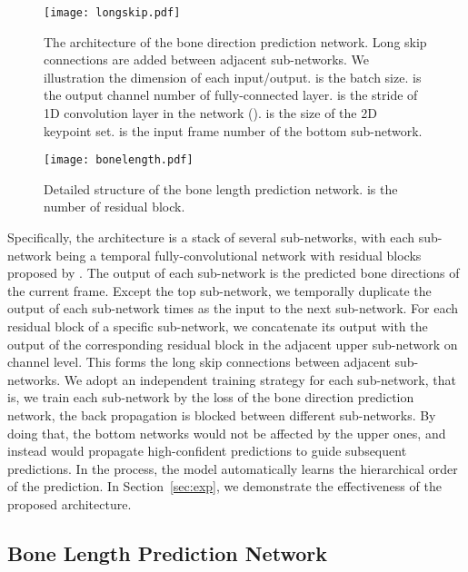 \documentclass[journal]{IEEEtran}
\begin{document}
\begin{figure}[!t]

\vspace{-2mm}
\centering
\texttt{[image: longskip.pdf]}

\caption{The architecture of the bone direction prediction network. Long skip connections are added between adjacent sub-networks. We illustration the dimension of each input/output.  is the batch size.  is the output channel number of fully-connected layer.  is the stride of 1D convolution layer in the network ().  is the size of the 2D keypoint set.  is
the input frame number of the bottom sub-network.}
\vspace{-1mm}
\label{fig:longpass}
\end{figure}
\begin{figure}[!t]

\vspace{+0mm}
\centering
\texttt{[image: bonelength.pdf]}

\caption{Detailed structure of the bone length prediction network.  is the number of residual block.}
\vspace{-1mm}
\label{fig:bl}
\end{figure}

Specifically, the architecture is a stack of several sub-networks, with each sub-network being a temporal fully-convolutional network with residual blocks proposed by \cite{pavllo20193d}. The output of each sub-network is the predicted bone directions of the current frame. Except the top sub-network, we temporally duplicate the output of each sub-network  times as the input to the next sub-network. For each residual block of a specific sub-network, we concatenate its output with the output of the corresponding residual block in the adjacent upper sub-network on channel level. This forms the long skip connections between adjacent sub-networks. We adopt an independent training strategy for each sub-network, that is, we train each sub-network by the loss of the bone direction prediction network, the back propagation is blocked between different sub-networks. By doing that, the bottom networks would not be affected by the upper ones, and instead would propagate high-confident predictions to guide subsequent predictions. In the process, the model automatically learns the hierarchical order of the prediction. In Section~\ref{sec:exp}, we demonstrate the effectiveness of the proposed architecture.



\subsection{Bone Length Prediction Network} \label{sec:length}
\end{document}
